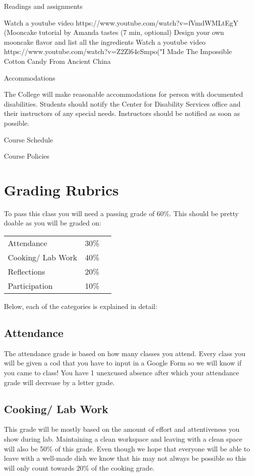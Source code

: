 \documentclass{article}
\begin{document}
Readings and assignments

Watch a youtube video https://www.youtube.com/watch?v=fVmdWMLtEgY (Mooncake tutorial by Amanda tastes (7 min, optional)
Design your own mooncake flavor and list all the ingredients 
Watch a youtube video https://www.youtube.com/watch?v=Z2Zl64cSmpo("I Made The Impossible Cotton Candy From Ancient China 

Accommodations 

The College will make reasonable accommodations for person with documented disabilities. Students should notify the Center for Disability Services office and their instructors of any special needs. Instructors should be notified as soon as possible.

Course Schedule

Course Policies

\section{Grading Rubrics} 


To pass this class you will need a passing grade of 60\%. This should be pretty doable as you will be graded on:

\begin{table}[h]
\begin{tabular}{lll}
 Attendance &  30\% \\
 Cooking/ Lab Work & 40\%  \\
 Reflections &  20\%  \\
 Participation & 10\% \\ 
\end{tabular}
\end{table}   

Below, each of the categories is explained in detail:
\subsection{Attendance}
 The attendance grade is based on how many classes you attend. Every class you will be given a cod that you have to input in a Google Form so we will know if you came to class! You have 1 unexcused absence after which  your attendance grade will decrease by a letter grade.

\subsection{Cooking/ Lab Work} This grade will be mostly based on the amount of effort and attentiveness you show during lab. Maintaining a clean workspace and leaving with a clean space will also be 50\% of this grade. Even though we hope that everyone will be able to leave with a well-made dish we know that his may not always be possible so this will only count towards 20\% of the cooking grade.
\end{document}
